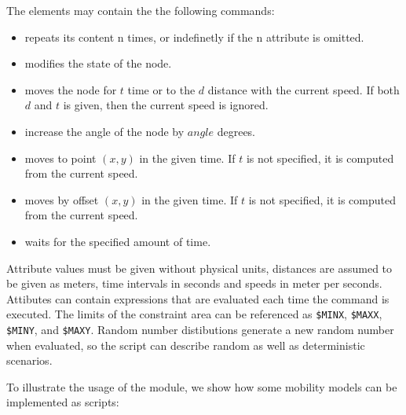 The  elements may contain the the following commands:

\begin{itemize}
\item {} repeats its content n times, or indefinetly if the n attribute
              is omitted.
\item {} modifies the state of the node.
\item {} moves the node for $t$ time or to the $d$ distance
with the current speed. If both $d$ and $t$ is given, then the current
speed is ignored.
\item {} increase the angle of the node by $angle$ degrees.
\item {} moves to point $(x,y)$ in the given time. If
$t$ is not specified, it is computed from the current speed.
\item {} moves by offset $(x,y)$ in the given time. If
$t$ is not specified, it is computed from the current speed.
\item {} waits for the specified amount of time.
\end{itemize}

Attribute values must be given without physical units, distances are assumed
to be given as meters, time intervals in seconds and speeds in meter per seconds.
Attibutes can contain expressions that are evaluated each time the
command is executed. The limits of the constraint area can be
referenced as \verb!$MINX!, \verb!$MAXX!, \verb!$MINY!, and \verb!$MAXY!.
Random number distibutions generate a new random number when evaluated,
so the script can describe random as well as deterministic scenarios.

To illustrate the usage of the module, we show how some mobility
models can be implemented as scripts:

